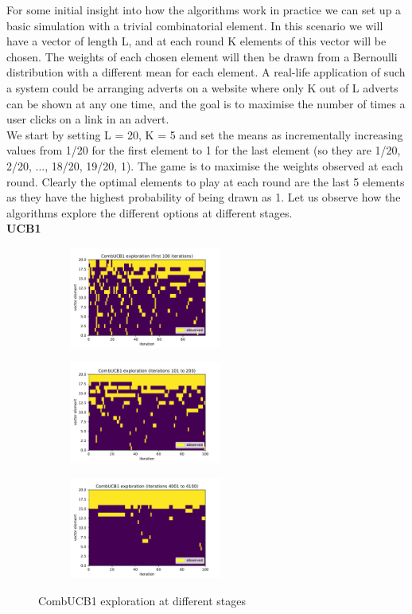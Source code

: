 For some initial insight into how the algorithms work in practice we can set up a basic simulation with a trivial combinatorial element. In this scenario we will have a vector of length L, and at each round K elements of this vector will be chosen. The weights of each chosen element will then be drawn from a Bernoulli distribution with a different mean for each element. A real-life application of such a system could be arranging adverts on a website where only K out of L adverts can be shown at any one time, and the goal is to maximise the number of times a user clicks on a link in an advert.\\

We start by setting L = 20, K = 5 and set the means as incrementally increasing values from 1/20 for the first element to 1 for the last element (so they are 1/20, 2/20, ..., 18/20, 19/20, 1). The game is to maximise the weights observed at each round. Clearly the optimal elements to play at each round are the last 5 elements as they have the highest probability of being drawn as 1. Let us observe how the algorithms explore the different options at different stages.\\


\noindent \textbf{UCB1}\\



\begin{figure}[h!]
\centering
\begin{subfigure}{.33\textwidth}
  \centering
  \includegraphics[width=50mm]{../plots/basicCombUCB1_100iters.pdf}
\end{subfigure}%
\begin{subfigure}{.33\textwidth}
  \centering
  \includegraphics[width=50mm]{../plots/basicCombUCB1_100_200iters.pdf}
\end{subfigure}
\begin{subfigure}{.33\textwidth}
  \centering
  \includegraphics[width=50mm]{../plots/basicCombUCB1_4000_4100iters.pdf}
\end{subfigure}
\caption{CombUCB1 exploration at different stages}
\label{fig:ullm-particle}
\end{figure}

